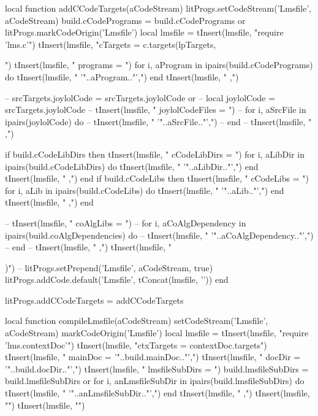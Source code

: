 local function addCCodeTargets(aCodeStream)
  litProgs.setCodeStream('Lmsfile', aCodeStream)
  build.cCodePrograms = build.cCodePrograms or { }
  litProgs.markCodeOrigin('Lmsfile')
  local lmsfile = {}
  tInsert(lmsfile, "require 'lms.c'\n")
  tInsert(lmsfile, "cTargets = c.targets(lpTargets, {")
  tInsert(lmsfile, "  programs = {")
  for i, aProgram in ipairs(build.cCodePrograms) do
    tInsert(lmsfile, "    '"..aProgram.."',")
  end
  tInsert(lmsfile, "  },")

--  srcTargets.joylolCode = srcTargets.joylolCode or { }
--  local joylolCode      = srcTargets.joylolCode
--  tInsert(lmsfile, "  joylolCodeFiles = {")
--  for i, aSrcFile in ipairs(joylolCode) do
--    tInsert(lmsfile, "    '"..aSrcFile.."',")
--  end
--  tInsert(lmsfile, "  },")

  if build.cCodeLibDirs then 
    tInsert(lmsfile, "  cCodeLibDirs = {")
    for i, aLibDir in ipairs(build.cCodeLibDirs) do
      tInsert(lmsfile, "    '"..aLibDir.."',")
    end
    tInsert(lmsfile, "  },")
  end
  if build.cCodeLibs then 
    tInsert(lmsfile, "  cCodeLibs = {")
    for i, aLib in ipairs(build.cCodeLibs) do
      tInsert(lmsfile, "    '"..aLib.."',")
    end
    tInsert(lmsfile, "  },")
  end

--  tInsert(lmsfile, "  coAlgLibs = {")
--  for i, aCoAlgDependency in ipairs(build.coAlgDependencies) do
--    tInsert(lmsfile, "    '"..aCoAlgDependency.."',")
--  end
--  tInsert(lmsfile, "  },")
  tInsert(lmsfile, "})")
--  litProgs.setPrepend('Lmsfile', aCodeStream, true)
  litProgs.addCode.default('Lmsfile', tConcat(lmsfile, '\n'))
end

litProgs.addCCodeTargets = addCCodeTargets
\stopLuaCode

\startMkIVCode
\def\compileLmsfile#1{
  \directlua{
    thirddata.literateProgs.compileLmsfile('#1')
  }
}

\def\addRecurseTargetsToLmsfile#1{
  \directlua{
    thirddata.literateProgs.addRecurseTargetsToLmsfile('#1')
  }
}
\stopMkIVCode

\startLuaCode
local function compileLmsfile(aCodeStream)
  setCodeStream('Lmsfile', aCodeStream)
  markCodeOrigin('Lmsfile')
  local lmsfile = {}
  tInsert(lmsfile, "require 'lms.contextDoc'\n")
  tInsert(lmsfile, "ctxTargets = contextDoc.targets{")
  tInsert(lmsfile, "  mainDoc        = '"..build.mainDoc.."',")
  tInsert(lmsfile, "  docDir         = '"..build.docDir.."',")
  tInsert(lmsfile, "  lmsfileSubDirs = {")
  build.lmsfileSubDirs = build.lmsfileSubDirs or { }
  for i, anLmsfileSubDir in ipairs(build.lmsfileSubDirs) do
    tInsert(lmsfile, "    '"..anLmsfileSubDir.."',")
  end
  tInsert(lmsfile, "  },")
  tInsert(lmsfile, "}")
  tInsert(lmsfile, "")
  
